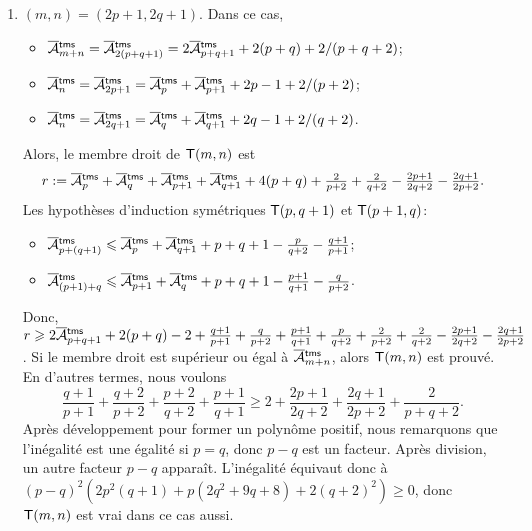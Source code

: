 \begin{enumerate}
  \item \((m,n) = (2p+1,2q+1)\). Dans ce cas,
    \begin{itemize}

      \item \(\OM{\fun{tms}}{m+n} = \OM{\fun{tms}}{2(p+q+1)} =
        2\OM{\fun{tms}}{p+q+1} + 2(p+q) + 2/(p+q+2)\);

      \item \(\OM{\fun{tms}}{n} = \OM{\fun{tms}}{2p+1} =
        \OM{\fun{tms}}{p} + \OM{\fun{tms}}{p+1} + 2p - 1 + 2/(p+2)\);

      \item \(\OM{\fun{tms}}{n} = \OM{\fun{tms}}{2q+1} =
        \OM{\fun{tms}}{q} + \OM{\fun{tms}}{q+1} + 2q - 1 + 2/(q+2)\).

    \end{itemize}
    Alors, le membre droit de \(\textsf{T}({m,n})\) est
    \begin{equation*}
      r := \OM{\fun{tms}}{p} + \OM{\fun{tms}}{q} + \OM{\fun{tms}}{p+1}
      + \OM{\fun{tms}}{q+1} + 4(p+q) + \tfrac{2}{p+2} + \tfrac{2}{q+2}
      - \tfrac{2p+1}{2q+2} - \tfrac{2q+1}{2p+2}.
    \end{equation*}
    Les hypothèses d'induction symétriques \(\textsf{T}({p,q+1})\) et
    \(\textsf{T}({p+1,q})\):
    \begin{itemize}

      \item \(\OM{\fun{tms}}{p+(q+1)} \leqslant \OM{\fun{tms}}{p} +
        \OM{\fun{tms}}{q+1} + p + q + 1 - \tfrac{p}{q+2}
        - \tfrac{q+1}{p+1}\);

      \item \(\OM{\fun{tms}}{(p+1)+q} \leqslant \OM{\fun{tms}}{p+1} +
        \OM{\fun{tms}}{q} + p + q + 1 - \tfrac{p+1}{q+1} -
        \tfrac{q}{p+2}\).

    \end{itemize}
    Donc, \(r \geqslant 2\OM{\fun{tms}}{p+q+1} + 2(p+q) - 2 +
    \tfrac{q+1}{p+1} + \tfrac{q}{p+2} + \tfrac{p+1}{q+1} +
    \tfrac{p}{q+2} + \tfrac{2}{p+2} + \tfrac{2}{q+2} -
    \tfrac{2p+1}{2q+2} - \tfrac{2q+1}{2p+2}\). Si le membre droit est
    supérieur ou égal à \(\OM{\fun{tms}}{m+n}\), alors
    \(\textsf{T}({m,n})\) est prouvé. En d'autres termes, nous voulons
    \begin{equation*}
      \frac{q+1}{p+1} + \frac{q+2}{p+2} + \frac{p+2}{q+2} +
      \frac{p+1}{q+1} \geqslant 2 + \frac{2p+1}{2q+2} +
      \frac{2q+1}{2p+2} + \frac{2}{p+q+2}.
    \end{equation*}
    Après développement pour former un polynôme positif, nous
    remarquons que l'inégalité est une égalité si \(p=q\), donc
    \(p-q\) est un facteur. Après division, un autre facteur \(p-q\)
    apparaît. L'inégalité équivaut donc à \((p-q)^2(2p^2(q+1) + p(2q^2
    + 9q + 8) + 2(q+2)^2) \geqslant 0\), donc \(\textsf{T}({m,n})\) est
    vrai dans ce cas aussi.

\end{enumerate}
